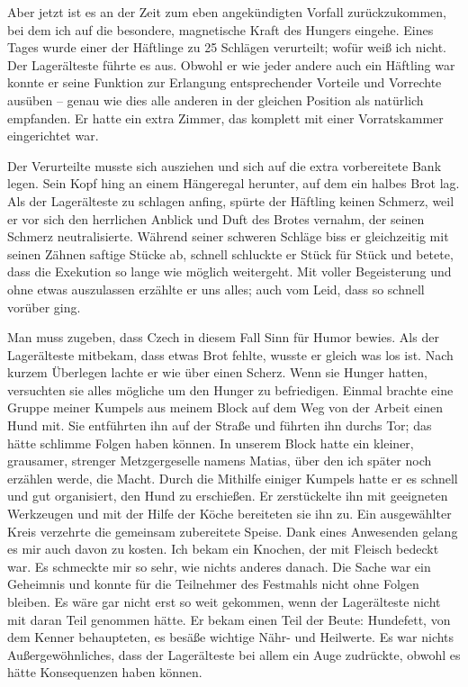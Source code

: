 Aber jetzt ist es an der Zeit zum eben angekündigten Vorfall zurückzukommen, bei dem ich auf die besondere, magnetische Kraft des Hungers eingehe. Eines Tages wurde einer der Häftlinge zu 25 Schlägen verurteilt; wofür weiß ich nicht. Der Lagerälteste führte es aus. Obwohl er wie jeder andere auch ein Häftling war konnte er seine Funktion zur Erlangung entsprechender Vorteile und Vorrechte ausüben -- genau wie dies alle anderen in der gleichen Position als natürlich empfanden. Er hatte ein extra Zimmer, das komplett mit einer Vorratskammer eingerichtet war.

Der Verurteilte musste sich ausziehen und sich auf die extra vorbereitete Bank legen. Sein Kopf hing an einem Hängeregal herunter, auf dem ein halbes Brot lag. Als der Lagerälteste zu schlagen anfing, spürte der Häftling keinen Schmerz, weil er vor sich den herrlichen Anblick und Duft des Brotes vernahm, der seinen Schmerz neutralisierte. Während seiner schweren Schläge biss er gleichzeitig mit seinen Zähnen saftige Stücke ab, schnell schluckte er Stück für Stück und betete, dass die Exekution so lange wie möglich weitergeht. Mit voller Begeisterung und ohne etwas auszulassen erzählte er uns alles; auch vom Leid, dass so schnell vorüber ging.

Man muss zugeben, dass Czech in diesem Fall Sinn für Humor bewies. Als der Lagerälteste mitbekam, dass etwas Brot fehlte, wusste er gleich was los ist. 
Nach kurzem Überlegen lachte er wie über einen Scherz. Wenn sie Hunger hatten, versuchten sie alles mögliche um den Hunger zu befriedigen. Einmal brachte eine Gruppe meiner Kumpels aus meinem Block auf dem Weg von der Arbeit einen Hund mit. Sie entführten ihn auf der Straße und führten ihn durchs Tor; das hätte schlimme Folgen haben können. In unserem Block hatte ein kleiner, grausamer, strenger Metzgergeselle namens Matias, über den ich später noch erzählen werde, die Macht. Durch die Mithilfe einiger Kumpels hatte er es schnell und gut organisiert, den Hund zu erschießen. Er zerstückelte ihn mit geeigneten Werkzeugen und mit der Hilfe der Köche bereiteten sie ihn zu. Ein ausgewählter Kreis verzehrte die gemeinsam zubereitete Speise. Dank eines Anwesenden gelang es mir auch davon zu kosten. Ich bekam ein Knochen, der mit Fleisch bedeckt war. Es schmeckte mir so sehr, wie nichts anderes danach. Die Sache war ein Geheimnis und konnte für die Teilnehmer des Festmahls nicht ohne Folgen bleiben. Es wäre gar nicht erst so weit gekommen, wenn der Lagerälteste nicht mit daran Teil genommen hätte. Er bekam einen Teil der Beute: Hundefett, von dem Kenner behaupteten, es besäße wichtige Nähr- und Heilwerte. Es war nichts Außergewöhnliches, dass der Lagerälteste bei allem ein Auge zudrückte, obwohl es hätte Konsequenzen haben können.

